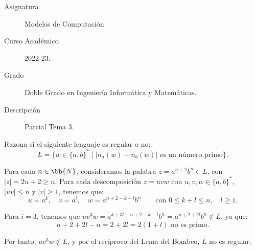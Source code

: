 \documentclass[12pt]{article}
\begin{document}

    
    

    \begin{description}
        \item[Asignatura] Modelos de Computación
        \item[Curso Académico] 2022-23.
        \item[Grado] Doble Grado en Ingeniería Informática y Matemáticas.
        \item[Descripción] Parcial Tema 3.
    \end{description}
    \newpage
    
    \begin{ejercicio}
        Razona si el siguiente lenguaje es regular o no:
        \begin{equation*}
            L=\{w\in \{a,b\}^* \mid |n_a(w)-n_b(w)| \text{ es un número primo}\}.
        \end{equation*}

        Para cada $n\in \bb{N}$, consideramos la palabra $z=a^{n+2}b^{n}\in L$, con $|z|=2n+2\geq n$.
        Para cada descomposición $z=uvw$ con $u,v,w\in \{a,b\}^*$, $|uv|\leq n$ y $|v|\geq 1$, tenemos que:
        \begin{equation*}
            u=a^k,\quad v=a^l,\quad w=a^{n+2-k-l}b^n\qquad \text{con }0\leq k+l\leq n,\quad l\geq 1.
        \end{equation*}

        Para $i=3$, tenemos que $uv^3w=a^{k+3l+n+2-k-l}b^n=a^{n+2+2l}b^n\notin L$, ya que:
        \begin{equation*}
            n+2+2l-n = 2+2l = 2(1+l) \text{ no es primo.}
        \end{equation*}

        Por tanto, $uv^3w \notin L$, y por el recíproco del Lema del Bombeo, $L$ no es regular.
    \end{ejercicio}
\end{document}
